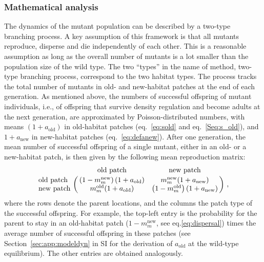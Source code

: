 \documentclass[11pt]{article}
\begin{document}
\subsubsection*{Mathematical analysis}
The dynamics of the mutant population can be described by a two-type branching process. A key assumption of this framework is that all mutants reproduce, disperse and die independently of each other. This is a reasonable assumption as long as the overall number of mutants is a lot smaller than the population size of the wild type. The two ``types'' in the name of method, two-type branching process, correspond to the two habitat types. The process tracks the total number of mutants in old- and new-habitat patches at the end of each generation. As mentioned above, the numbers of successful offspring of mutant individuals, i.e., of offspring that survive density regulation and become adults at the next generation, are approximated by Poisson-distributed numbers, with means $(1+ a_{\text{old}})$ in old-habitat patches (eq.~\eqref{eq:sold} and eq.~\eqref{Seq:s_old}), and $1+ a_{\text{new}}$ in new-habitat patches (eq.~\eqref{eq:defanew}). After one generation, the mean number of successful offspring of a single mutant, either in an old- or a new-habitat patch, is then given by the following mean reproduction matrix:
%
\begin{equation}\label{eq:mean_repro}
	\bordermatrix{ ~ & \text{old patch} & \text{new patch} \cr
		\text{old patch} & \left(1-m_m^{\text{new}}\right) (1+a_{\text{old}}) & m_m^{\text{new}} (1+a_{\text{new}}) \cr
		\text{new patch} & m_m^{\text{old}} (1+a_{\text{old}}) & \left(1-m_m^{\text{old}}\right) (1+a_{\text{new}})
		}\ ,
\end{equation}
%
where the rows denote the parent locations, and the columns the patch type of the successful offspring. 
For example, the top-left entry is the probability for the parent to stay in an old-habitat patch ($1-m_m^{\text{new}}$, see eq.\eqref{eq:dispersal}) times the average number of successful offspring in these patches (see Section~\ref{sec:app:modeldyn} in SI for the derivation of $a_{\text{old}}$ at the wild-type equilibrium). The other entries are obtained analogously.
\end{document}
